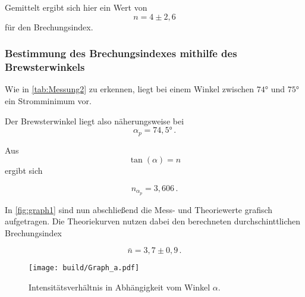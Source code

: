 Gemittelt ergibt sich hier ein Wert von
\begin{equation*}
    n = 4 \pm 2,6
\end{equation*}
für den Brechungsindex.

\newpage

\subsubsection{Bestimmung des Brechungsindexes mithilfe des Brewsterwinkels}

Wie in \autoref{tab:Messung2} zu erkennen, liegt bei einem Winkel zwischen $74°$ und $75°$ ein Stromminimum vor.

Der Brewsterwinkel liegt also näherungsweise bei
\begin{equation*}
    \alpha_p = 74,5 ° \,.
\end{equation*}

Aus
\begin{equation*}
    \tan(\alpha) = n 
\end{equation*}
ergibt sich

\begin{equation*}
    n_{\alpha_p} = 3,606 \,.
\end{equation*}

In \autoref{fig:graph1} sind nun abschließend die Mess- und Theoriewerte grafisch aufgetragen. Die Theoriekurven nutzen dabei den berechneten durchschinttlichen Brechungsindex

\begin{equation*}
    \bar{n} = 3,7 \pm 0,9 \,.
\end{equation*}

\begin{figure}
    \centering
    \texttt{[image: build/Graph\_a.pdf]}
    \caption{Intensitätsverhältnis in Abhängigkeit vom Winkel $\alpha$.}
    \label{fig:graph1}
\end{figure}
